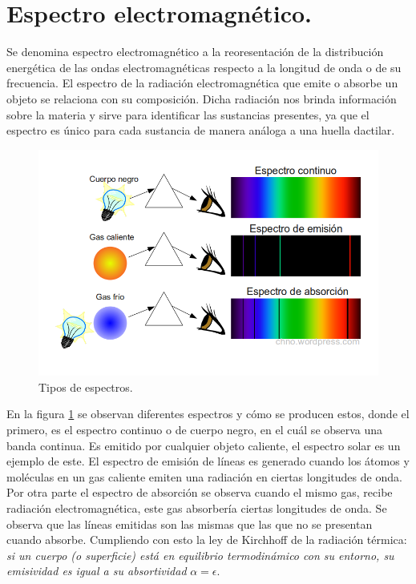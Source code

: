 \section{Espectro electromagnético.}
Se denomina espectro electromagnético a la reoresentación de la distribución energética de las ondas electromagnéticas respecto a la longitud de onda o de su frecuencia. El espectro de la radiación electromagnética que emite o absorbe un objeto se relaciona con su composición. Dicha radiación nos brinda información sobre la materia y sirve para identificar las sustancias presentes, ya que el espectro es único para cada sustancia de manera análoga a una huella dactilar. 
\begin{figure}[h!] %
	\centering
	\includegraphics[width=1\linewidth]{Imagenes/espectros_absorcion_y_emision}
	\caption{Tipos de espectros. \cite{FisicaCh}}
	\label{fig:esq_espectro01}
\end{figure}

En la figura \ref{fig:esq_espectro01} se observan diferentes espectros y cómo se producen estos, donde el primero, es el espectro continuo o de cuerpo negro, en el cuál se observa una banda continua. Es emitido por cualquier objeto caliente, el espectro solar es un ejemplo de este. El espectro de emisión de líneas es generado cuando los átomos y moléculas en un gas caliente emiten una radiación en ciertas longitudes de onda. Por otra parte el espectro de absorción se observa cuando el mismo gas, recibe radiación electromagnética, este gas absorbería ciertas longitudes de onda. Se observa que las líneas emitidas son las mismas que las que no se presentan cuando absorbe. Cumpliendo con esto la ley de Kirchhoff de la radiación térmica: \emph{si un cuerpo (o superficie) está en equilibrio termodinámico con su entorno, su emisividad es igual a su absortividad} $\alpha = \epsilon$.


